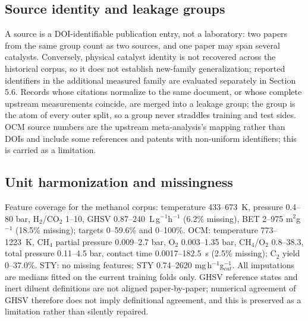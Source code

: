 \documentclass[11pt,a4paper]{article}
\begin{document}
\subsection{Source identity and leakage groups}
A source is a DOI-identifiable publication entry, not a laboratory: two papers from the
same group count as two sources, and one paper may span several catalysts. Conversely,
physical catalyst identity is not recovered across the historical corpus, so it does not establish new-family generalization; reported identifiers in the additional measured family are evaluated separately in Section 5.6. Records whose citations normalize to the same document,
or whose complete upstream measurements coincide, are merged into a leakage group; the
group is the atom of every outer split, so a group never straddles training and test
sides. OCM source numbers are the upstream meta-analysis's mapping rather than DOIs and
include some references and patents with non-uniform identifiers; this is carried as a
limitation.

\subsection{Unit harmonization and missingness}
Feature coverage for the methanol corpus: temperature 433--673~K, pressure 0.4--80 bar,
H$_2$/CO$_2$ 1--10, GHSV 0.87--240~L\,g$^{-1}$h$^{-1}$ (6.2\% missing), BET 2--975
m$^2$g$^{-1}$ (18.5\% missing); targets 0--59.6\% and 0--100\%. OCM: temperature
773--1223~K, CH$_4$ partial pressure 0.009--2.7 bar, O$_2$ 0.003--1.35 bar, CH$_4$/O$_2$
0.8--38.3, total pressure 0.11--4.5 bar, contact time 0.0017--182.5~s (2.5\% missing);
C$_2$ yield 0--37.0\%. STY: no missing features; STY 0.74--2620
mg\,h$^{-1}$g$_{cat}^{-1}$. All imputations are medians fitted on the current training
folds only. GHSV reference states and inert diluent definitions are not aligned
paper-by-paper; numerical agreement of GHSV therefore does not imply definitional
agreement, and this is preserved as a limitation rather than silently repaired.
\end{document}
